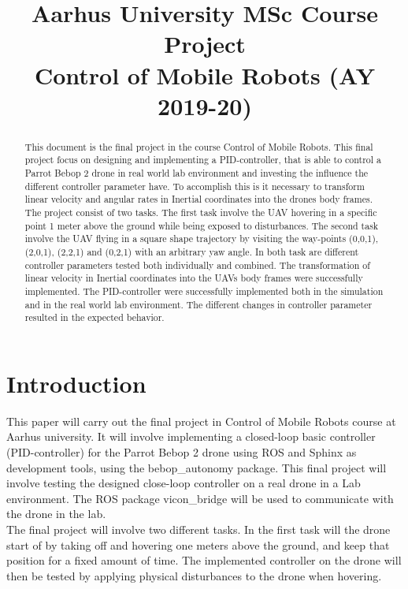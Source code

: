 \documentclass[conference]{IEEEtran}
\begin{document}
\title{Aarhus University MSc Course Project  \\ Control of Mobile Robots (AY 2019-20)}

\author{
}

\maketitle

\begin{abstract}

This document is the final project in the course Control of Mobile Robots. This final project focus on designing and implementing a PID-controller, that is able to control a Parrot Bebop 2 drone in real world lab environment and investing the influence the different controller parameter have. To accomplish this is it necessary to transform linear velocity and angular rates in Inertial coordinates into the drones body frames. The project consist of two tasks. The first task involve the UAV hovering in a specific point 1 meter above the ground while being exposed to disturbances. The second task involve the UAV flying in a square shape trajectory by visiting the way-points (0,0,1), (2,0,1), (2,2,1) and (0,2,1) with an arbitrary yaw angle. 
In both task are different controller parameters tested both individually and combined. The transformation of linear velocity in Inertial coordinates into the UAVs body frames were successfully implemented. The PID-controller were successfully implemented both in the simulation and in the real world lab environment. The different changes in controller parameter resulted in the expected behavior. 

\end{abstract}

\section{Introduction}

This paper will carry out the final project in Control of Mobile Robots course at Aarhus university. It will involve implementing a closed-loop basic controller (PID-controller) for the Parrot Bebop 2 drone using ROS and Sphinx as development tools, using the bebop\_autonomy package. This final project will involve testing the designed close-loop controller on a real drone in a Lab environment. The ROS package vicon\_bridge will be used to communicate with the drone in the lab. \\
The final project will involve two different tasks. In the first task will the drone start of by taking off and hovering one meters above the ground, and keep that position for a fixed amount of time. The implemented controller on the drone will then be tested by applying physical disturbances to the drone when hovering. 
\end{document}
